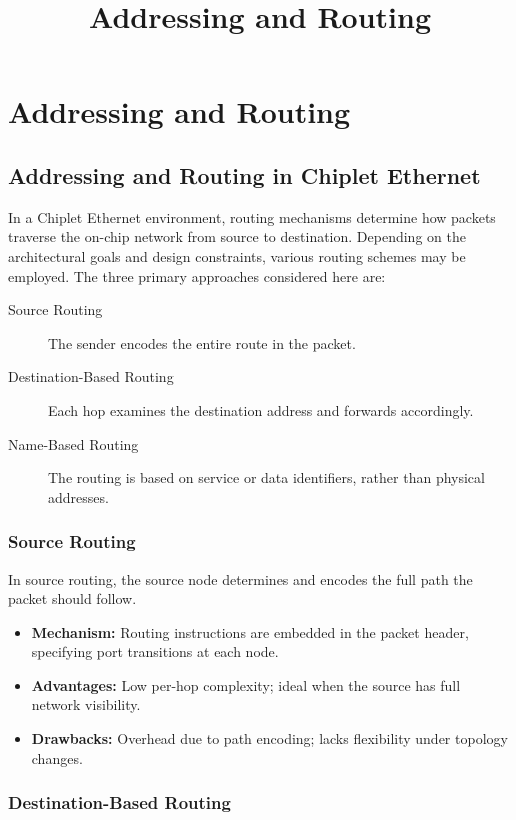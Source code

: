 \documentclass[../OAE-SPEC-MAIN.tex]{subfiles}
\title{Addressing and Routing}
\begin{document}
\chapter{Addressing and Routing}

\section{Addressing and Routing in Chiplet Ethernet}

In a Chiplet Ethernet environment, routing mechanisms determine how packets traverse the on-chip network from source to destination. Depending on the architectural goals and design constraints, various routing schemes may be employed. The three primary approaches considered here are:

\begin{description}
\item[Source Routing] The sender encodes the entire route in the packet.
\item[Destination-Based Routing] Each hop examines the destination address and forwards accordingly.
\item[Name-Based Routing] The routing is based on service or data identifiers, rather than physical addresses.
\end{description}

\subsection{Source Routing}

In source routing, the source node determines and encodes the full path the packet should follow.

\begin{itemize}
\item \textbf{Mechanism:} Routing instructions are embedded in the packet header, specifying port transitions at each node.
\item \textbf{Advantages:} Low per-hop complexity; ideal when the source has full network visibility.
\item \textbf{Drawbacks:} Overhead due to path encoding; lacks flexibility under topology changes.
\end{itemize}

\subsection{Destination-Based Routing}
\end{document}
